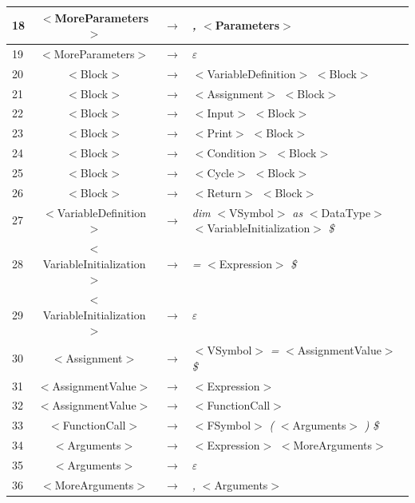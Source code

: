 \documentclass[10pt,a4paper,titlepage]{article}
\begin{document}
{\begin{center}
\begin{tabular}{ | l | c  c  l | }
      18 & $<$MoreParameters$>$           & $\rightarrow$ & {\it ,} $<$Parameters$>$ \\ \hline
      19 & $<$MoreParameters$>$           & $\rightarrow$ & $\varepsilon$ \\ \hline
      20 & $<$Block$>$                    & $\rightarrow$ & $<$VariableDefinition$>$ $<$Block$>$ \\ \hline
      21 & $<$Block$>$                    & $\rightarrow$ & $<$Assignment$>$ $<$Block$>$ \\ \hline
      22 & $<$Block$>$                    & $\rightarrow$ & $<$Input$>$ $<$Block$>$ \\ \hline
      23 & $<$Block$>$                    & $\rightarrow$ & $<$Print$>$ $<$Block$>$ \\ \hline
      24 & $<$Block$>$                    & $\rightarrow$ & $<$Condition$>$ $<$Block$>$ \\ \hline
      25 & $<$Block$>$                    & $\rightarrow$ & $<$Cycle$>$ $<$Block$>$ \\ \hline
      26 & $<$Block$>$                    & $\rightarrow$ & $<$Return$>$ $<$Block$>$ \\ \hline
      27 & $<$VariableDefinition$>$       & $\rightarrow$ & {\it dim} $<$VSymbol$>$ {\it as} $<$DataType$>$ $<$VariableInitialization$>$ {\it \$} \\ \hline
      28 & $<$VariableInitialization$>$   & $\rightarrow$ & {\it =} $<$Expression$>$ {\it \$} \\ \hline
      29 & $<$VariableInitialization$>$   & $\rightarrow$ & $\varepsilon$ \\ \hline
      30 & $<$Assignment$>$               & $\rightarrow$ & $<$VSymbol$>$ {\it =} $<$AssignmentValue$>$ {\it \$} \\ \hline
      31 & $<$AssignmentValue$>$          & $\rightarrow$ & $<$Expression$>$ \\ \hline
      32 & $<$AssignmentValue$>$          & $\rightarrow$ & $<$FunctionCall$>$ \\ \hline
      33 & $<$FunctionCall$>$             & $\rightarrow$ & $<$FSymbol$>$ {\it (} $<$Arguments$>$ {\it )} {\it \$} \\ \hline
      34 & $<$Arguments$>$                & $\rightarrow$ & $<$Expression$>$ $<$MoreArguments$>$ \\ \hline
      35 & $<$Arguments$>$                & $\rightarrow$ & $\varepsilon$ \\ \hline
      36 & $<$MoreArguments$>$            & $\rightarrow$ & {\it ,} $<$Arguments$>$ \\ \hline

\end{tabular}
\end{center}}
\end{document}
